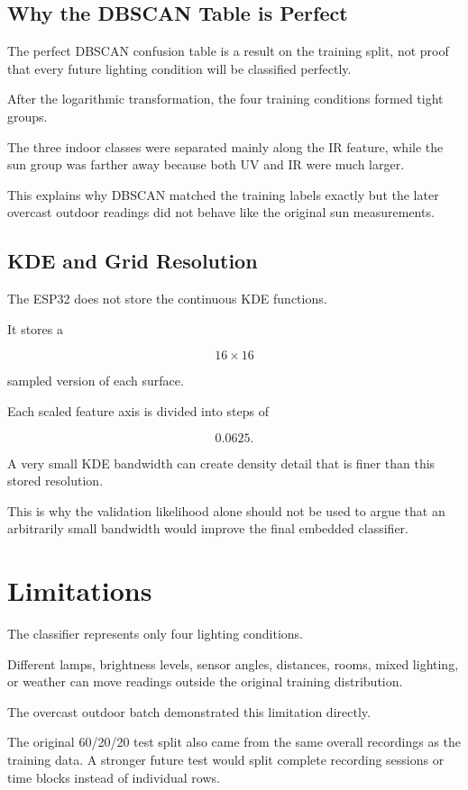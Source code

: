 \documentclass[10pt,a4paper,twocolumn]{article}
\begin{document}
\subsection{Why the DBSCAN Table is Perfect}

The perfect DBSCAN confusion table is a result on the training split, not proof
that every future lighting condition will be classified perfectly.

After the logarithmic transformation, the four training conditions formed
tight groups.

The three indoor classes were separated mainly along the IR feature, while the
sun group was farther away because both UV and IR were much larger.

This explains why DBSCAN matched the training labels exactly but the later
overcast outdoor readings did not behave like the original sun measurements.


\subsection{KDE and Grid Resolution}

The ESP32 does not store the continuous KDE functions.

It stores a

\[
16\times16
\]

sampled version of each surface.

Each scaled feature axis is divided into steps of

\[
0.0625.
\]

A very small KDE bandwidth can create density detail that is finer than this
stored resolution.

This is why the validation likelihood alone should not be used to argue that
an arbitrarily small bandwidth would improve the final embedded classifier.


\section{Limitations}

The classifier represents only four lighting conditions.

Different lamps, brightness levels, sensor angles, distances, rooms, mixed
lighting, or weather can move readings outside the original training
distribution.

The overcast outdoor batch demonstrated this limitation directly.

The original 60/20/20 test split also came from the same overall recordings as
the training data. A stronger future test would split complete recording
sessions or time blocks instead of individual rows.
\end{document}

